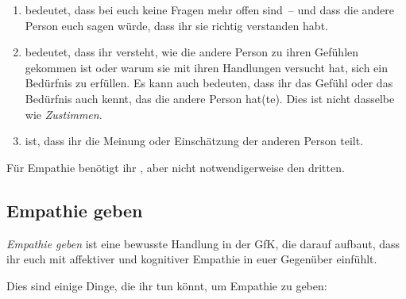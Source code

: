 \begin{enumerate}
  \item {} bedeutet, dass bei euch keine Fragen mehr offen sind~-- und dass die andere Person euch sagen würde, dass ihr sie richtig verstanden habt.
  \item {} bedeutet, dass ihr versteht, wie die andere Person zu ihren Gefühlen gekommen ist oder warum sie mit ihren Handlungen versucht hat, sich ein Bedürfnis zu erfüllen. Es kann auch bedeuten, dass ihr das Gefühl oder das Bedürfnis auch kennt, das die andere Person hat(te). Dies ist nicht dasselbe wie \emph{Zustimmen}.
  \item {} ist, dass ihr die Meinung oder Einschätzung der anderen Person teilt.
\end{enumerate}

Für Empathie benötigt ihr , aber nicht notwendigerweise den dritten.


\subsection{Empathie geben}
\label{empathie-geben}

\emph{Empathie geben} ist eine bewusste Handlung in der GfK, die darauf aufbaut, dass ihr euch mit affektiver und kognitiver Empathie in euer Gegenüber einfühlt.

Dies sind einige Dinge, die ihr tun könnt, um Empathie zu geben:

